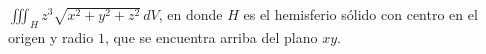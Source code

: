 \item $\iiint_H z^3 \sqrt{x^2 + y^2 + z^2} \, dV$, en donde $H$ es el hemisferio sólido con centro en el origen y radio $1$, que se encuentra arriba del plano $xy$.
